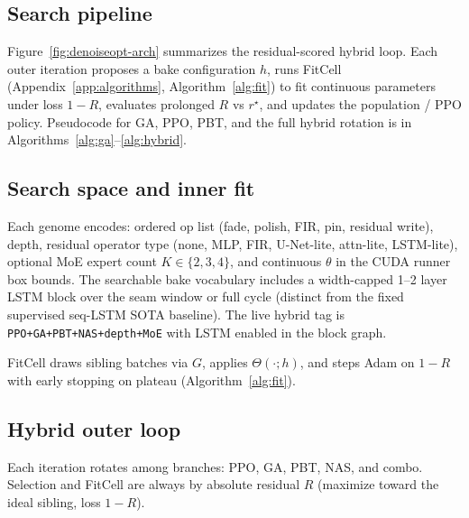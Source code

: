 \subsection{Search pipeline}
\label{sec:pipeline-overview}

Figure~\ref{fig:denoiseopt-arch} summarizes the residual-scored hybrid loop.
Each outer iteration proposes a bake configuration $h$, runs FitCell (Appendix~\ref{app:algorithms}, Algorithm~\ref{alg:fit}) to fit continuous parameters under loss $1-R$, evaluates prolonged $R$ vs $r^{\star}$, and updates the population / PPO policy.
Pseudocode for GA, PPO, PBT, and the full hybrid rotation is in Algorithms~\ref{alg:ga}--\ref{alg:hybrid}.



\subsection{Search space and inner fit}
\label{sec:search-space}

Each genome encodes: ordered op list (fade, polish, FIR, pin, residual write), depth, residual operator type (none, MLP, FIR, U-Net-lite, attn-lite, LSTM-lite), optional MoE expert count $K\in\{2,3,4\}$, and continuous $\theta$ in the CUDA runner box bounds.
The searchable bake vocabulary includes a width-capped 1--2 layer LSTM block over the seam window or full cycle (distinct from the fixed supervised seq-LSTM SOTA baseline).
The live hybrid tag is \texttt{PPO+GA+PBT+NAS+depth+MoE} with LSTM enabled in the block graph.

FitCell draws sibling batches via $G$, applies $\Theta(\cdot;h)$, and steps Adam on $1-R$ with early stopping on plateau (Algorithm~\ref{alg:fit}).

\subsection{Hybrid outer loop}
\label{sec:hybrid}

Each iteration rotates among branches: PPO, GA, PBT, NAS, and combo.
Selection and FitCell are always by absolute residual $R$ (maximize toward the ideal sibling, loss $1-R$).

